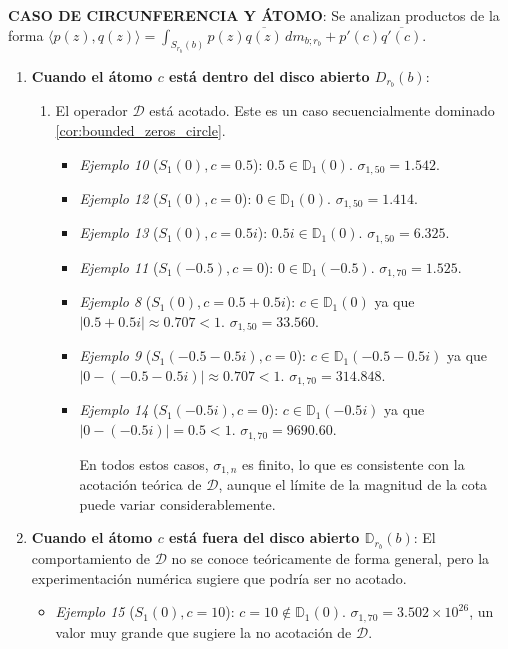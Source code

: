 \noindent \textbf{CASO DE CIRCUNFERENCIA Y ÁTOMO}: Se analizan productos de la forma $\langle p(z),q(z) \rangle=\int_{S_{r_b}(b)} p(z)\overline{q(z)}\, dm_{b;r_b} + p'(c)\overline{q'(c)}$.
\begin{enumerate}
	\item \textbf{Cuando el átomo $c$ está dentro del disco abierto $D_{r_b}(b)$}:
	      \begin{enumerate}
		      \item El operador $\mathcal{D}$ está acotado. Este es un caso secuencialmente dominado \ref{cor:bounded_zeros_circle}.
		            \begin{itemize}
			            \item \textit{Ejemplo 10} ($S_1(0), c=0.5$): $0.5 \in \mathbb{D}_1(0)$. $\sigma_{1,50} = 1.542$.
			            \item \textit{Ejemplo 12} ($S_1(0), c=0$): $0 \in \mathbb{D}_1(0)$. $\sigma_{1,50} = 1.414$.
			            \item \textit{Ejemplo 13} ($S_1(0), c=0.5i$): $0.5i \in \mathbb{D}_1(0)$. $\sigma_{1,50} = 6.325$.
			            \item \textit{Ejemplo 11} ($S_1(-0.5), c=0$): $0 \in \mathbb{D}_1(-0.5)$. $\sigma_{1,70} = 1.525$.
			            \item \textit{Ejemplo 8} ($S_1(0), c=0.5+0.5i$): $c \in \mathbb{D}_1(0)$ ya que $|0.5+0.5i| \approx 0.707 < 1$. $\sigma_{1,50} = 33.560$.
			            \item \textit{Ejemplo 9} ($S_1(-0.5-0.5i), c=0$): $c \in \mathbb{D}_1(-0.5-0.5i)$ ya que $|0-(-0.5-0.5i)| \approx 0.707 < 1$. $\sigma_{1,70} = 314.848$.
			            \item \textit{Ejemplo 14} ($S_1(-0.5i), c=0$): $c \in \mathbb{D}_1(-0.5i)$ ya que $|0-(-0.5i)| = 0.5 < 1$. $\sigma_{1,70} = 9690.60$.

			                  En todos estos casos, $\sigma_{1,n}$ es finito, lo que es consistente con la acotación teórica de $\mathcal{D}$, aunque el límite de la magnitud de la cota puede variar considerablemente.
		            \end{itemize}
	      \end{enumerate}
	\item \textbf{Cuando el átomo $c$ está fuera del disco abierto $\mathbb{D}_{r_b}(b)$}: El comportamiento de $\mathcal{D}$ no se conoce teóricamente de forma general, pero la experimentación numérica sugiere que podría ser no acotado.
	      \begin{itemize}
		      \item \textit{Ejemplo 15} ($S_1(0), c=10$): $c=10 \notin \mathbb{D}_1(0)$. $\sigma_{1,70} = 3.502 \times 10^{26}$, un valor muy grande que sugiere la no acotación de $\mathcal{D}$.
	      \end{itemize}
\end{enumerate}

